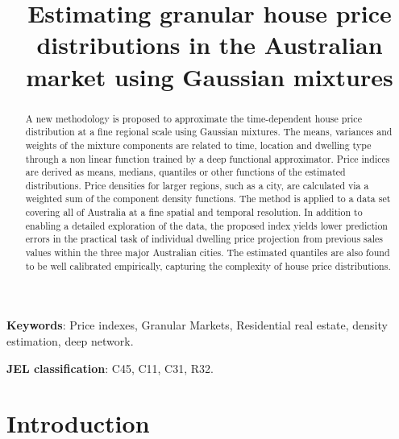 
\title{\Large \bf Estimating granular house price distributions in the Australian market using Gaussian mixtures}
\maketitle
\thispagestyle{empty}

\bigskip

\begin{abstract} 
A new methodology is proposed to approximate the time-dependent house price distribution at a fine regional scale using Gaussian mixtures. The means, variances and weights of the mixture components are related to time, location and dwelling type through a non linear function trained by a deep functional approximator. Price indices are derived as means, medians, quantiles or other functions of the estimated distributions. Price densities for larger regions, such as a city, are calculated via a weighted sum of the component density functions. The method is applied to a data set covering all of Australia at a fine spatial and temporal resolution. In addition to enabling a detailed exploration of the data, the proposed index yields lower prediction errors in the practical task of individual dwelling price projection from previous sales values within the three major Australian cities.  The estimated quantiles are also found to be well calibrated empirically, capturing the complexity of house price distributions.
\end{abstract}

\textbf{Keywords}:  Price indexes, Granular Markets, Residential real estate, density estimation, deep network.

\textbf{JEL classification}: C45, C11, C31, R32.



\bigskip

\clearpage

\doublespacing


\section{Introduction}\label{sec1}



